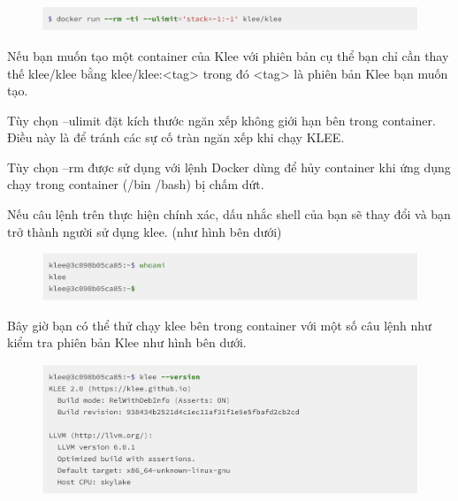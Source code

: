 \documentclass[12pt,a4paper]{report}
\begin{document}
\begin{itemize}
\begin{figure}[ht]
\begin{center}
\includegraphics[scale=0.3]{hinhanh/kleecontainer.png}
\end{center}
\end{figure}

Nếu bạn muốn tạo một container của Klee với phiên bản cụ thể bạn chỉ cần thay thế klee/klee bằng klee/klee:<tag> trong đó <tag> là phiên bản Klee bạn muốn tạo.

Tùy chọn --ulimit đặt kích thước ngăn xếp không giới hạn bên trong container. Điều này là để tránh các sự cố tràn ngăn xếp khi chạy KLEE.

Tùy chọn --rm được sử dụng với lệnh Docker dùng để hủy container khi ứng dụng chạy trong container (/bin /bash) bị chấm dứt. \newpage

Nếu câu lệnh trên thực hiện chính xác, dấu nhắc shell của bạn sẽ thay đổi và bạn trở thành người sử dụng klee. (như hình bên dưới)

\begin{figure}[ht]
\begin{center}
\includegraphics[scale=.3]{hinhanh/shellcontainerklee.png}
\end{center}
\end{figure}

Bây giờ bạn có thể thử chạy klee bên trong container với một số câu lệnh  như kiểm tra phiên bản Klee như hình bên dưới.

\begin{figure}[ht]
\begin{center}
\includegraphics[scale=0.3]{hinhanh/kleeversion.png}
\end{center}
\end{figure}


\end{itemize}
\end{document}
